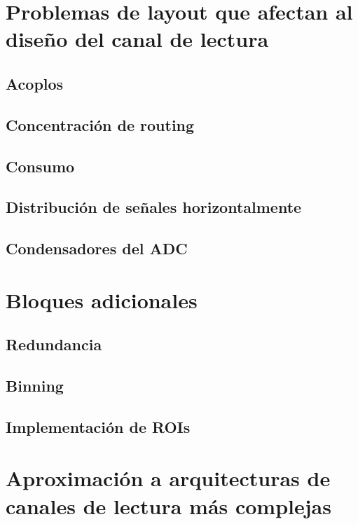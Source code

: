\documentclass[12pt,a4paper,oneside,titlepage]{report}
\begin{document}
\section{Problemas de layout que afectan al diseño del canal de lectura}

\subsection{Acoplos}

\subsection{Concentración de routing}

\subsection{Consumo}

\subsection{Distribución de señales horizontalmente}

\subsection{Condensadores del ADC}

\section{Bloques adicionales}

\subsection{Redundancia}

\subsection{Binning}

\subsection{Implementación de ROIs}

\section{Aproximación a arquitecturas de canales de lectura más complejas}
\end{document}
